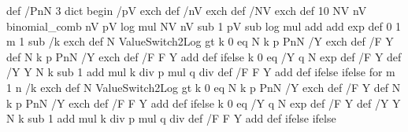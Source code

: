 {{{                                              } def
                /PnN {
                              3 dict begin
                              /pV exch def
                              /nV exch def
                              /NV exch def
                              10
                              NV nV binomial_comb
                              nV pV log mul
                              NV nV sub 1 pV sub log mul add add
                              exp
                             } def
                               0 1 m 1 sub {
                                                        /k exch def       %
                                                       N ValueSwitch2Log gt {  k 0 eq
                                                                                     { N k p PnN /Y exch def /F Y def }
                                                                                     { N k p PnN /Y exch def /F F Y add def }
                                                                          ifelse }
                                                                     { k 0 eq
                                                                     { /Y q N exp def
                                                                      /F Y def }
                                                                     { /Y Y N k sub 1 add mul k div p mul q div def
                                                                      /F F Y add def
                                                                      } ifelse
                                                                   } ifelse
                                                   } for
        m 1 n {             %
                     /k exch def       %
                     N ValueSwitch2Log gt { k 0 eq
                                                    { N k p PnN /Y exch def /F Y def }
                                                    { N k p PnN /Y exch def /F F Y add def } ifelse }
                     {  k 0 eq
                                     { /Y q N exp def
                                      /F Y def }
                                     { /Y Y N k sub 1 add mul k div p mul q div def
                                     /F F Y add def
                                     } ifelse
                      } ifelse  %
}}}
